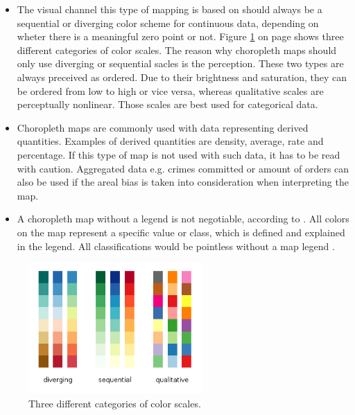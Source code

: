 \begin{itemize}

\item The visual channel this type of mapping is based on should always be a sequential or diverging color scheme for continuous data, depending on wheter there is a meaningful zero point or not. Figure \ref{fig:colorbrewer} on page \pageref{fig:colorbrewer} shows three different categories of color scales. The reason why choropleth maps should only use diverging or sequential sacles is the perception. These two types are always preceived as ordered. Due to their brightness and saturation, they can be ordered from low to high or vice versa, whereas qualitative scales are perceptually nonlinear. Those scales are best used for categorical data.

\item Choropleth maps are commonly used with data representing derived quantities. Examples of derived quantities are density, average, rate and percentage. If this type of map is not used with such data, it has to be read with caution. Aggregated data e.g. crimes committed or amount of orders can also be used if the areal bias is taken into consideration when interpreting the map.

\item A choropleth map without a legend is not negotiable, according to \citeauthor{Dent2008}. All colors on the map represent a specific value or class, which is defined and explained in the legend. All classifications would be pointless without a map legend .

\end{itemize}

\begin{figure}[!htb]
\centering
\includegraphics[height=5cm,keepaspectratio]{images/choropleth/color-scales.png}
\caption[
    Three different categories of color scales, Urldate: 07.2016 \newline
    \small\texttt{\url{http://www.gnuplotting.org/figs/colorbrewer.png}}
]{Three different categories of color scales.}
\label{fig:colorbrewer}
\end{figure}

